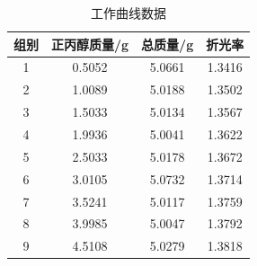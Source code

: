 \documentclass[12pt]{ctexart}
\numberwithin{equation}{section}
\begin{document}
\begin{longtable}{cccc}
    \caption{工作曲线数据} \\
    \hline
    组别 & 正丙醇质量/g & 总质量/g & 折光率 \\
    \hline
    1 & 0.5052 & 5.0661 & 1.3416 \\
    2 & 1.0089 & 5.0188 & 1.3502 \\
    3 & 1.5033 & 5.0134 & 1.3567 \\
    4 & 1.9936 & 5.0041 & 1.3622 \\
    5 & 2.5033 & 5.0178 & 1.3672 \\
    6 & 3.0105 & 5.0732 & 1.3714 \\
    7 & 3.5241 & 5.0117 & 1.3759 \\
    8 & 3.9985 & 5.0047 & 1.3792 \\
    9 & 4.5108 & 5.0279 & 1.3818 \\
    \hline
\end{longtable}
\end{document}

